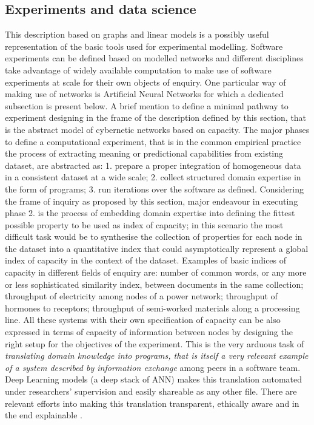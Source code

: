 \documentclass[14pt]{extarticle}
\begin{document}
\subsection*{Experiments and data science}
\label{subsec:experiments}
\hspace*{15mm}This description based on graphs and linear models is a possibly useful representation of the basic tools used for experimental modelling. Software experiments can be defined based on modelled networks and different disciplines take advantage of widely available computation to make use of software experiments at scale for their own objects of enquiry. One particular way of making use of networks is Artificial Neural Networks for which a dedicated subsection is present below.
\newline
A brief mention to define a minimal pathway to experiment designing in the frame of the description defined by this section, that is the abstract model of cybernetic networks based on capacity. The major phases to define a computational experiment, that is in the common empirical practice the process of extracting meaning or predictional capabilities from existing dataset, are abstracted as: 1. prepare a proper integration of homogeneous data in a consistent dataset at a wide scale; 2. collect structured domain expertise in the form of programs; 3. run iterations over the software as defined. Considering the frame of inquiry as proposed by this section, major endeavour in executing phase 2. is the process of embedding domain expertise into defining the fittest possible property to be used as index of capacity; in this scenario the most difficult task would be to synthesise the collection of properties for each node in the dataset into a quantitative index that could asymptotically represent a global index of capacity in the context of the dataset.
\newline
Examples of basic indices of capacity in different fields of enquiry are: number of common words, or any more or less sophisticated similarity index, between documents in the same collection; throughput of electricity among nodes of a power network; throughput of hormones to receptors; throughput of semi-worked materials along a processing line. All these systems with their own specification of capacity can be also expressed in terms of capacity of information between nodes by designing the right setup for the objectives of the experiment. This is the very arduous task of \textit{translating domain knowledge into programs, that is itself a very relevant example of a system described by information exchange} \cite{nguyen2008global} among peers in a software team. Deep Learning models (a deep stack of ANN) makes this translation automated under researchers' supervision and easily shareable as any other file. There are relevant efforts into making this translation transparent, ethically aware and in the end explainable \cite{enwiki:1083004803}.
\end{document}

